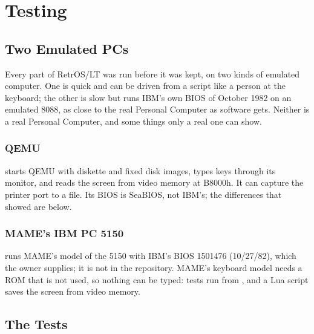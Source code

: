 \mwnewpart
\renewcommand\runningtitle{Section 7. Testing}
\chapter{Testing}
\sectioncontents

\section{Two Emulated PCs}

\begin{plainwords}
Every part of RetrOS/LT was run before it was kept, on two kinds of
emulated computer. One is quick and can be driven from a script like a
person at the keyboard; the other is slow but runs IBM's own BIOS of
October 1982 on an emulated 8088, as close to the real Personal Computer as
software gets. Neither is a real Personal Computer, and some things only a
real one can show.
\end{plainwords}

\subsection{QEMU}  starts QEMU with diskette and fixed
disk images, types keys through its monitor, and reads the screen from
video memory at B8000h. It can capture the printer port to a file. Its
BIOS is SeaBIOS, not IBM's; the differences that showed are below.

\subsection{MAME's IBM PC 5150}  runs MAME's model
of the 5150 with IBM's BIOS 1501476 (10/27/82), which the owner supplies;
it is not in the repository. MAME's keyboard model needs a ROM that is not
used, so nothing can be typed: tests run from , and a
Lua script saves the screen from video memory.

\section{The Tests}

